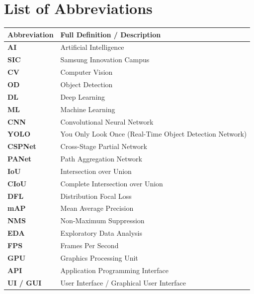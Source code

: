 \documentclass{sicaireport}
\begin{document}
\chapter*{List of Abbreviations}
\begin{table}[htbp]
    \renewcommand{\arraystretch}{1.3}
    \begin{tabularx}{\textwidth}{p{3.5cm} X}
        \toprule
        \textbf{Abbreviation} & \textbf{Full Definition / Description} \\
        \midrule
        \textbf{AI}           & Artificial Intelligence \\
        \textbf{SIC}          & Samsung Innovation Campus \\
        \textbf{CV}           & Computer Vision \\
        \textbf{OD}           & Object Detection \\
        \textbf{DL}           & Deep Learning \\
        \textbf{ML}           & Machine Learning \\
        \textbf{CNN}          & Convolutional Neural Network \\
        \textbf{YOLO}         & You Only Look Once (Real-Time Object Detection Network) \\
        \textbf{CSPNet}       & Cross-Stage Partial Network \\
        \textbf{PANet}        & Path Aggregation Network \\
        \textbf{IoU}          & Intersection over Union \\
        \textbf{CIoU}         & Complete Intersection over Union \\
        \textbf{DFL}          & Distribution Focal Loss \\
        \textbf{mAP}          & Mean Average Precision \\
        \textbf{NMS}          & Non-Maximum Suppression \\
        \textbf{EDA}          & Exploratory Data Analysis \\
        \textbf{FPS}          & Frames Per Second \\
        \textbf{GPU}          & Graphics Processing Unit \\
        \textbf{API}          & Application Programming Interface \\
        \textbf{UI / GUI}     & User Interface / Graphical User Interface \\
        \bottomrule
    \end{tabularx}
\end{table}
\clearpage
\end{document}
